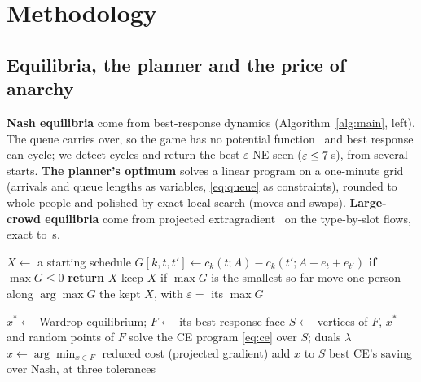 \documentclass{article}
\begin{document}
\begin{table}[t]\centering\small
\caption{Five shared facilities, one model (minutes per person per visit). Selfish: the worst Nash equilibrium
found. PoA, random: with random arrival times and a planner who keeps a buffer (Section~\ref{sec:res-selfish}).}\label{tab:domains}

\end{table}

\section{Methodology}\label{sec:method}
\subsection{Equilibria, the planner and the price of anarchy}
\textbf{Nash equilibria} come from best-response dynamics (Algorithm~\ref{alg:main}, left). The queue carries over,
so the game has no potential function~\cite{rosenthal} and best response can cycle; we detect cycles and return the
best $\varepsilon$-NE seen ($\varepsilon\le7$\,s), from several starts. \textbf{The planner's optimum} solves a linear program on a one-minute grid (arrivals and queue lengths
as variables, \eqref{eq:queue} as constraints), rounded to whole people and polished by exact local search (moves and
swaps). \textbf{Large-crowd equilibria} come from projected extragradient~\cite{korpelevich} on the type-by-slot
flows, exact to \RwardGap\,s.

\begin{algorithm}[t]\footnotesize
\caption{Left: an $\varepsilon$-Nash equilibrium by best response. Right: is there a correlated equilibrium cheaper
than Nash in a large crowd?}\label{alg:main}
\begin{minipage}[t]{0.47\linewidth}
\begin{algorithmic}[1]
\State $X\gets$ a starting schedule
\Repeat
\State $G[k,t,t']\gets c_k(t;A)-c_k(t';A-e_t+e_{t'})$
\State \textbf{if} $\max G\le 0$ \textbf{return} $X$ 
\State keep $X$ if $\max G$ is the smallest so far
\State move one person along $\arg\max G$
\State \Return the kept $X$, with $\varepsilon=$ its $\max G$
\end{algorithmic}
\end{minipage}\hfill
\begin{minipage}[t]{0.5\linewidth}
\begin{algorithmic}[1]
\State $x^*\gets$ Wardrop equilibrium; $F\gets$ its best-response face
\State $S\gets$ vertices of $F$, $x^*$ and random points of $F$
\Repeat {}
\State solve the CE program \eqref{eq:ce} over $S$; duals $\lambda$
\State $x\gets\arg\min_{x\in F}$ reduced cost (projected gradient)
\State add $x$ to $S$
\State \Return best CE's saving over Nash, at three tolerances
\end{algorithmic}
\end{minipage}
\end{algorithm}
\end{document}
